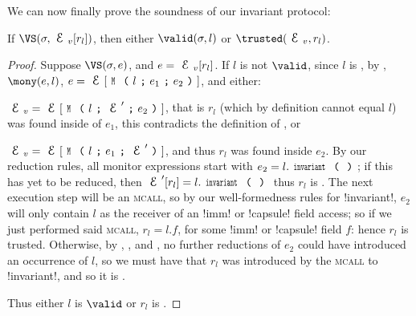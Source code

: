 \setcounter{theorem}{0}\LS
We can now finally prove the soundness of our invariant protocol:
\SS
\begin{theorem}[Soundness]\rm
If $\VS(\s, \EV[r_l])$, then either $\valid(\s,l)$ or $\trusted(\EV,r_l)$.
\end{theorem}\SS
\begin{proof}
\noindent Suppose $\VS(\s, e)$, and $e = \EV[r_l]$. If $l$ is not $\valid$, since $l$ is \reach, by , $\mony(e,l)$, $e = \E[\M{l}{e_1}{e_2}]$, and either:
\begin{iitemize}
	\item $\EV = \E[\M{l}{\E'}{e_2}]$, that is $r_l$ (which by definition cannot equal $l$) was found inside of $e_1$, this contradicts the definition of \mony, or
	\item $\EV = \E[\M{l}{e_1}{\E'}]$, and thus $r_l$ was found inside $e_2$. By our reduction rules, all monitor expressions start with $e_2=l.\invariant$; if this has yet to be reduced, then $\E'[r_l] = l.\invariant$ thus $r_l$ is \trusted. The next execution step will be an \textsc{mcall}, so by our well-formedness rules for \Q!invariant!, $e_2$ will only contain $l$ as the receiver of an \Q!imm! or \Q!capsule! field access; so if we just performed said \textsc{mcall}, $r_l = l.f$, for some \Q!imm! or \Q!capsule! field $f$: hence $r_l$ is trusted. Otherwise, by , , and \HNC, no further reductions of $e_2$ could have introduced an occurrence of $l$, so we must have that $r_l$ was introduced by the \textsc{mcall} to \Q!invariant!, and so it is \trusted.
\end{iitemize}
Thus either $l$ is $\valid$ or $r_l$ is \trusted.
\end{proof}